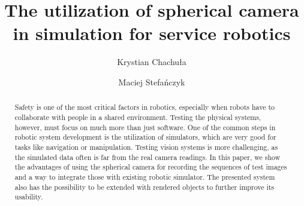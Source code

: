 \documentclass{svproc}
\begin{document}
\mainmatter

\title{The utilization of spherical camera in simulation for service robotics}

\author{Krystian Chachuła \and Maciej Stefańczyk\inst{[0000-0001-9948-6319]}}


\maketitle

\begin{abstract}

    Safety is one of the most critical factors in robotics, especially when robots have to 
    collaborate with people in a shared environment. Testing the physical systems, however, must
    focus on much more than just software. One of the common steps in robotic system development
    is the utilization of simulators, which are very good for tasks like navigation or manipulation.
    Testing vision systems is more challenging, as the simulated data often is far from the
    real camera readings. In this paper, we show the advantages of using the spherical camera
    for recording the sequences of test images and a way to integrate those with existing
    robotic simulator. The presented system also has the possibility to be extended with rendered
    objects to further improve its usability.


\end{abstract}
\end{document}
